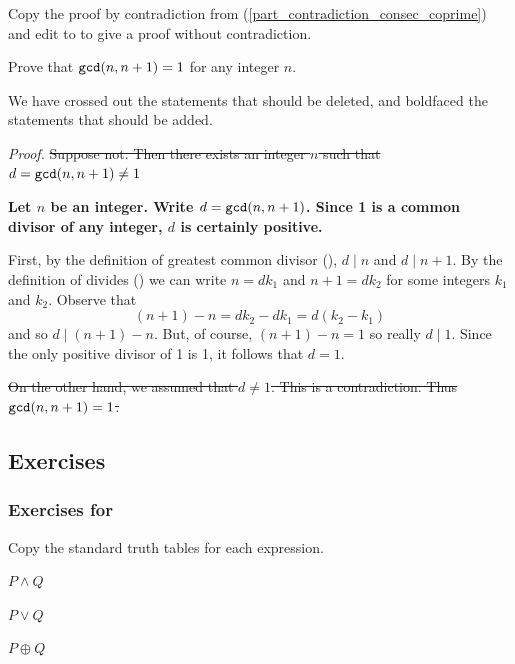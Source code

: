 \begin{exam}
\label{exam_avoid_contradiction_consec_coprime}
    Copy the proof by contradiction from  (\ref{part_contradiction_consec_coprime}) and edit to to give a proof without contradiction.  
    
    Prove that $\texttt{gcd}(n,n+1)=1$ for any integer $n$.
    
        \begin{soln}
            We have crossed out the statements that should be deleted, and boldfaced the statements that should be added.

            \emph{Proof.} \st{Suppose not. Then there exists an integer $n$ such that $d=\texttt{gcd}(n,n+1)\neq 1$} 
        
            \textbf{Let $n$ be an integer. Write $d=\texttt{gcd}(n,n+1)$. Since 1 is a common divisor of any integer, $d$ is certainly positive.}
        
            First, by the definition of greatest common divisor (), $d \mid n$ and $d \mid n+1$.  By the definition of divides () we can write $n = dk_1$ and $n+1 = dk_2$ for some integers $k_1$ and $k_2$.  Observe that $$(n+1) - n = dk_2 - dk_1 = d(k_2-k_1)$$ and so $d \mid (n+1)-n$.  But, of course, $(n+1)-n=1$ so really $d \mid 1$. Since the only positive divisor of 1 is 1, it follows that $d =1$.  

            \st{On the other hand, we assumed that $d \neq 1$.  This is a contradiction. Thus $\texttt{gcd}(n,n+1)=1$.} 
        \end{soln}    
\end{exam} 

\subsection{Exercises}


\subsubsection*{Exercises for  \subandor}

\begin{exer}[\exerP] %
\label{exer_standard_truthtables}
    Copy the standard truth tables for each expression. 
        \begin{exerpart}
            \item $P \land Q$
            \item $P \lor Q$
            \item $P \oplus Q$ 
        \end{exerpart}
\end{exer}

